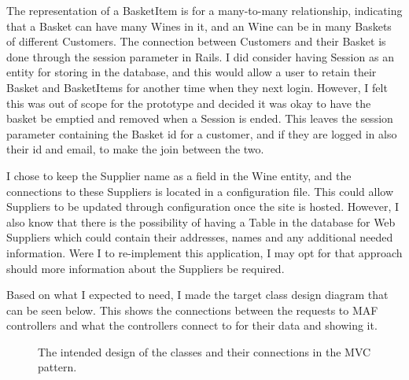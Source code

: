 \documentclass[12pt]{article}
\begin{document}
The representation of a BasketItem is for a many-to-many relationship, indicating that a Basket can have many Wines in it, and an Wine can be in many Baskets of different Customers. The connection between Customers and their Basket is done through the session parameter in Rails. I did consider having Session as an entity for storing in the database, and this would allow a user to retain their Basket and BasketItems for another time when they next login. However, I felt this was out of scope for the prototype and decided it was okay to have the basket be emptied and removed when a Session is ended. This leaves the session parameter containing the Basket id for a customer, and if they are logged in also their id and email, to make the join between the two.

I chose to keep the Supplier name as a field in the Wine entity, and the connections to these Suppliers is located in a configuration file. This could allow Suppliers to be updated through configuration once the site is hosted. However, I also know that there is the possibility of having a Table in the database for Web Suppliers which could contain their addresses, names and any additional needed information. Were I to re-implement this application, I may opt for that approach should more information about the Suppliers be required.

Based on what I expected to need, I made the target class design diagram that can be seen below. This shows the connections between the requests to MAF controllers and what the controllers connect to for their data and showing it.

\vspace*{\fill}
\begin{figure}[H]
        \centering
\noindent{}%
                \caption{The intended design of the classes and their connections in the MVC pattern.}
                \label{fig: Target Class Diagram.} 
\end{figure}
\end{document}
